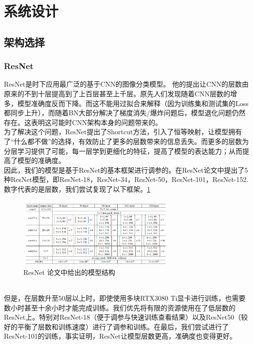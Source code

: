 \documentclass[hyperref, UTF8, 12pt]{article}
\theoremstyle{definition}
\begin{document}
\section{系统设计}
\subsection{架构选择}
\subsubsection{ResNet}
ResNet是时下应用最广泛的基于CNN的图像分类模型。\cite{he2015deep} 他的提出让CNN的层数由原来的不到十层提高到了上百层甚至上千层。原先人们发现随着CNN层数的增多，模型准确度反而下降。而这不能用过拟合来解释（因为训练集和测试集的Loss都同步上升），而随着BN大部分解决了梯度消失/爆炸问题后，模型退化问题仍然存在。这表明这可能时CNN架构本身的问题带来的。
\\ 
\indent
为了解决这个问题，ResNet提出了Shortcut方法，引入了恒等映射，让模型拥有了“什么都不做”的选择，有效防止了更多的层数带来的信息丢失。而更多的层数为分层学习提供了可能，每一层学到更细化的特征，提高了模型的表达能力；从而提高了模型的准确度。
\\ 
\indent
因此，我们的模型是基于ResNet的基本框架进行调参的。在ResNet论文\cite{he2015deep}中提出了5种ResNet模型，即ResNet-18，ResNet-34，ResNet-50，ResNet-101，ResNet-152. 数字代表的是层数，我们尝试复现了以下框架。\ref{Fig.resnet1}
\begin{figure}[h] %
	\centering %
	\includegraphics[width=0.7\textwidth]{resnet.png} %
	\caption{ResNet 论文中给出的模型结构} %
	\label{Fig.resnet1} %
\end{figure}
\\
\indent
但是，在层数升至50层以上时，即使使用多块RTX3080 Ti显卡进行训练，也需要数小时甚至十余小时才能完成训练。我们优先将有限的资源使用在了低层数的ResNet上。特别对ResNet-18（便于调参与快速训练查看结果）以及ResNet50（较好的平衡了层数和训练速度）进行了调参和训练。在最后，我们尝试进行了ResNet-101的训练，事实证明，ResNet让模型层数更高，准确度也变得更好。
\\
\indent
\end{document}
